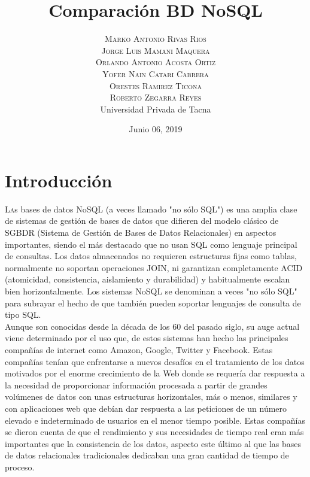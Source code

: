 \documentclass[twoside,twocolumn]{article}
\title{Comparación BD NoSQL} %
\author{%
\textsc{Marko Antonio Rivas Rios} \\[1ex] %
\textsc{Jorge Luis Mamani Maquera} \\[1.01ex] %
\textsc{Orlando Antonio Acosta Ortiz} \\[1.02ex] %
\textsc{Yofer Nain Catari Cabrera} \\[1.03ex] %
\textsc{Orestes Ramirez Ticona} \\[1.04ex] %
\textsc{Roberto Zegarra Reyes} \\[1.05ex] %
\normalsize Universidad Privada de Tacna \\  %
\normalsize {} %
}
\date{Junio 06, 2019} %
\begin{document}
\maketitle


\section{Introducción}

\lettrine[nindent=0em,lines=2]{L}as bases de datos NoSQL (a veces llamado "no sólo SQL") es una amplia clase de sistemas de gestión de bases de datos que difieren del modelo clásico de SGBDR (Sistema de Gestión de Bases de Datos Relacionales) en aspectos importantes, siendo el más destacado que no usan SQL como lenguaje principal de consultas. Los datos almacenados no requieren estructuras fijas como tablas, normalmente no soportan operaciones JOIN, ni garantizan completamente ACID (atomicidad, consistencia, aislamiento y durabilidad) y habitualmente escalan bien horizontalmente. Los sistemas NoSQL se denominan a veces "no sólo SQL" para subrayar el hecho de que también pueden soportar lenguajes de consulta de tipo SQL.\textbf{}\\
Aunque son conocidas desde la década de los 60 del pasado siglo, su auge actual viene determinado por el uso que, de estos sistemas han hecho las principales compañías de internet como Amazon, Google, Twitter y Facebook. Estas compañías tenían que enfrentarse a nuevos desafíos en el tratamiento de los datos motivados por el enorme crecimiento de la Web donde se requería dar respuesta a la necesidad de proporcionar información procesada a partir de grandes volúmenes de datos con unas estructuras horizontales, más o menos, similares y con aplicaciones web que debían dar respuesta a las peticiones de un número elevado e indeterminado de usuarios en el menor tiempo posible. Estas compañías se dieron cuenta de que el rendimiento y sus necesidades de tiempo real eran más importantes que la consistencia de los datos, aspecto este último al que las bases de datos relacionales tradicionales dedicaban una gran cantidad de tiempo de proceso.\textbf{}\\
\end{document}
